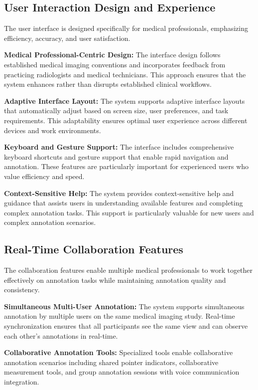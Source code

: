 \subsection{User Interaction Design and Experience}

The user interface is designed specifically for medical professionals, emphasizing efficiency, accuracy, and user satisfaction.

\textbf{Medical Professional-Centric Design:} The interface design follows established medical imaging conventions and incorporates feedback from practicing radiologists and medical technicians. This approach ensures that the system enhances rather than disrupts established clinical workflows.

\textbf{Adaptive Interface Layout:} The system supports adaptive interface layouts that automatically adjust based on screen size, user preferences, and task requirements. This adaptability ensures optimal user experience across different devices and work environments.

\textbf{Keyboard and Gesture Support:} The interface includes comprehensive keyboard shortcuts and gesture support that enable rapid navigation and annotation. These features are particularly important for experienced users who value efficiency and speed.

\textbf{Context-Sensitive Help:} The system provides context-sensitive help and guidance that assists users in understanding available features and completing complex annotation tasks. This support is particularly valuable for new users and complex annotation scenarios.

\subsection{Real-Time Collaboration Features}

The collaboration features enable multiple medical professionals to work together effectively on annotation tasks while maintaining annotation quality and consistency.

\textbf{Simultaneous Multi-User Annotation:} The system supports simultaneous annotation by multiple users on the same medical imaging study. Real-time synchronization ensures that all participants see the same view and can observe each other's annotations in real-time.

\textbf{Collaborative Annotation Tools:} Specialized tools enable collaborative annotation scenarios including shared pointer indicators, collaborative measurement tools, and group annotation sessions with voice communication integration.

